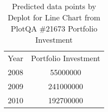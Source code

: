 \begin{table}
    \begin{tabular}{|c|c|}
Year & Portfolio Investment \\
2008 & 55000000 \\
2009 & 241000000 \\
2010 & 192700000 \\
    \end{tabular}
\caption{Predicted data points by Deplot for Line Chart from PlotQA \#21673 Portfolio Investment}
     \label{tab:deplot-plotqa-line-21673}
\end{table}

